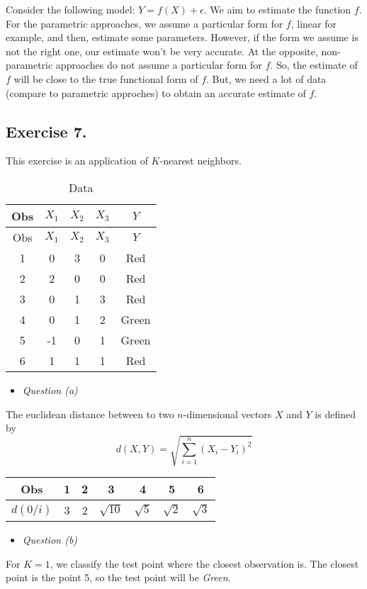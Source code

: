 \documentclass[]{book}
\providecommand{\tightlist}{%
  \setlength{\itemsep}{0pt}\setlength{\parskip}{0pt}}
\begin{document}
Consider the following model: \(Y = f(X) + \epsilon\). We aim to estimate the function \(f\). For the parametric approaches, we assume a particular form for \(f\), linear for example, and then, estimate some parameters. However, if the form we assume is not the right one, our estimate won't be very accurate. At the opposite, non-parametric approaches do not assume a particular form for \(f\). So, the estimate of \(f\) will be close to the true functional form of \(f\). But, we need a lot of data (compare to parametric approches) to obtain an accurate estimate of \(f\).

\hypertarget{exercise-7.}{%
\subsection{Exercise 7.}\label{exercise-7.}}

This exercise is an application of \(K\)-nearest neighbors.

\begin{longtable}[]{@{}ccccc@{}}
\caption{Data}\tabularnewline
\toprule
Obs & \(X_1\) & \(X_2\) & \(X_3\) & \(Y\)\tabularnewline
\midrule
\endfirsthead
\toprule
Obs & \(X_1\) & \(X_2\) & \(X_3\) & \(Y\)\tabularnewline
\midrule
\endhead
1 & 0 & 3 & 0 & Red\tabularnewline
2 & 2 & 0 & 0 & Red\tabularnewline
3 & 0 & 1 & 3 & Red\tabularnewline
4 & 0 & 1 & 2 & Green\tabularnewline
5 & -1 & 0 & 1 & Green\tabularnewline
6 & 1 & 1 & 1 & Red\tabularnewline
\bottomrule
\end{longtable}

\begin{itemize}
\tightlist
\item
  \emph{Question (a)}
\end{itemize}

The euclidean distance between to two \(n\)-dimensional vectors \(X\) and \(Y\) is defined by
\[ d(X, Y) = \sqrt{\sum_{i = 1}^n (X_i - Y_i)^2}\]

\begin{longtable}[]{@{}ccccccc@{}}
\toprule
Obs & 1 & 2 & 3 & 4 & 5 & 6\tabularnewline
\midrule
\endhead
\(d(0/i)\) & 3 & 2 & \(\sqrt{10}\) & \(\sqrt{5}\) & \(\sqrt{2}\) & \(\sqrt{3}\)\tabularnewline
\bottomrule
\end{longtable}

\begin{itemize}
\tightlist
\item
  \emph{Question (b)}
\end{itemize}

For \(K = 1\), we classify the test point where the closest observation is. The closest point is the point 5, so the test point will be \emph{Green}.
\end{document}
